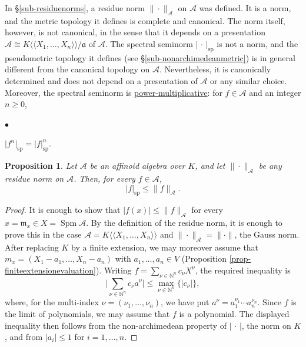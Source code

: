 \documentclass[a4paper,12pt, dvipdfmx]{jsbook}
\def\N{\mathbb{N}}
\def\m{\mathfrak{m}}
\def\sp{\mathop{\mathrm{sp}}\nolimits}
\def\Spm{\mathop{\mathrm{Spm}}\nolimits}
\def\dl{\langle\!\langle}
\def\dr{\rangle\!\rangle}
\newcommand{\abs}[1]{\lvert#1\rvert}
\newcommand{\abss}[1]{\|#1\|}
\renewenvironment{itemize}%
{%
   \begin{list}{\parbox{1zw}{$\bullet$}}%
   {%
      \setlength{\topsep}{.5zh}
      \setlength{\itemindent}{0zw}
      \setlength{\leftmargin}{3zw}%
      \setlength{\rightmargin}{0zw}%
      \setlength{\labelsep}{.5zw}%
      \setlength{\labelwidth}{3zw}%
      \setlength{\itemsep}{0.2em}%
      \setlength{\parsep}{0em}%
      \setlength{\listparindent}{0zw}%
   }
}{%
   \end{list}%
}
\theoremstyle{plain}
\newtheorem{prop}[thm]{\bfseries Proposition}
\theoremstyle{definition}
\begin{document}
In \S\ref{sub-residuenorms}, a residue norm $\abss{\cdot}_{\mathcal{A}}$ on $\mathcal{A}$ was defined.
It is a norm, and the metric topology it defines is complete and canonical. The norm itself, however, is not canonical, in the sense that it depends on a presentation $\mathcal{A}\cong K\dl X_1,\ldots,X_n\dr/\mathfrak{a}$ of $\mathcal{A}$.
The spectral seminorm $\abs{\,\cdot\,}_{\sp}$ is not a norm, and the pseudometric topology it defines (see \S\ref{sub-nonarchimedeanmetric}) is in general different from the canonical topology on $\mathcal{A}$. Nevertheless, it is canonically determined and does not depend on a presentation of $\mathcal{A}$ or any similar choice.
Moreover, the spectral seminorm is \underline{power-multiplicative}: for $f\in\mathcal{A}$ and an integer $n\geq 0$,
\begin{itemize}
\item[(d)] $\abs{f^n}_{\sp}=\abs{f}^n_{\sp}$.
\end{itemize}

\begin{prop}\label{prop-spectralandresiduenorms}{\rm 
Let $\mathcal{A}$ be an affinoid algebra over $K$, and let $\abss{\cdot}_{\mathcal{A}}$ be any residue norm on $\mathcal{A}$.
Then, for every $f\in\mathcal{A}$,
$$
\abs{f}_{\sp}\leq\abss{f}_{\mathcal{A}}.
$$}
\end{prop}

\begin{proof}[Proof]
It is enough to show that $\abs{f(x)}\leq\abss{f}_{\mathcal{A}}$ for every $x=\m_x\in X=\Spm\mathcal{A}$.
By the definition of the residue norm, it is enough to prove this in the case $\mathcal{A}=K\dl X_1,\ldots,X_n\dr$ and $\abss{\cdot}_{\mathcal{A}}=\abss{\cdot}$, the Gauss norm.
After replacing $K$ by a finite extension, we may moreover assume that $m_x=(X_1-a_1,\ldots,X_n-a_n)$ with $a_1,\ldots,a_n\in V$ (Proposition \ref{prop-finiteextensionevaluation}).
Writing $f=\sum_{\nu\in\N^n}c_{\nu}X^{\nu}$, the required inequality is
$$
\abs{\sum_{\nu\in\N^n}c_{\nu}a^{\nu}}\leq\max_{\nu\in\N^n}\{\abs{c_{\nu}}\},
$$
where, for the multi-index $\nu=(\nu_1,\ldots,\nu_n)$, we have put $a^{\nu}=a^{\nu_1}_1\cdots a^{\nu_n}_n$.
Since $f$ is the limit of polynomials, we may assume that $f$ is a polynomial.
The displayed inequality then follows from the non-archimedean property of $\abs{\,\cdot\,}$, the norm on $K$, and from $\abs{a_i}\leq 1$ for $i=1,\ldots,n$.
\end{proof}
\end{document}
